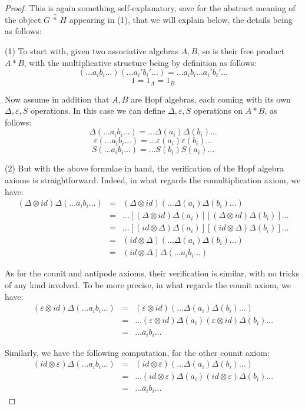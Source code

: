 \documentclass[12pt]{amsbook}
\begin{document}
\begin{proof}
This is again something self-explanatory, save for the abstract meaning of the object $G\,\hat{*}\,H$ appearing in (1), that we will explain below, the details being as follows:

\medskip

(1) To start with, given two associative algebras $A,B$, so is their free product $A*B$, with the multiplicative structure being by definition as follows:
$$(\ldots a_ib_i\ldots)(\ldots a_i'b_i'\ldots)=\ldots a_ib_i\ldots a_i'b_i'\ldots$$
$$1=1_A=1_B$$

Now assume in addition that $A,B$ are Hopf algebras, each coming with its own $\Delta,\varepsilon,S$ operations. In this case we can define $\Delta,\varepsilon,S$ operations on $A*B$, as follows:
$$\Delta(\ldots a_ib_i\ldots)=\ldots\Delta(a_i)\Delta(b_i)\ldots$$
$$\varepsilon(\ldots a_ib_i\ldots)=\ldots\varepsilon(a_i)\varepsilon(b_i)\ldots$$
$$S(\ldots a_ib_i\ldots)=\ldots S(b_i)S(a_i)\ldots$$

(2) But with the above formulae in hand, the verification of the Hopf algebra axioms is straightforward. Indeed, in what regards the comultiplication axiom, we have:
\begin{eqnarray*}
(\Delta\otimes id)\Delta(\ldots a_ib_i\ldots)
&=&(\Delta\otimes id)(\ldots\Delta(a_i)\Delta(b_i)\ldots)\\
&=&\ldots[(\Delta\otimes id)\Delta(a_i)][(\Delta\otimes id)\Delta(b_i)]\ldots\\
&=&\ldots[(id\otimes\Delta)\Delta(a_i)][(id\otimes\Delta)\Delta(b_i)]\ldots\\
&=&(id\otimes\Delta)(\ldots\Delta(a_i)\Delta(b_i)\ldots)\\
&=&(id\otimes\Delta)\Delta(\ldots a_ib_i\ldots)
\end{eqnarray*}

As for the counit and antipode axioms, their verification is similar, with no tricks of any kind involved. To be more precise, in what regards the counit axiom, we have:
\begin{eqnarray*}
(\varepsilon\otimes id)\Delta(\ldots a_ib_i\ldots)
&=&(\varepsilon\otimes id)(\ldots\Delta(a_i)\Delta(b_i)\ldots)\\
&=&\ldots(\varepsilon\otimes id)\Delta(a_i)(\varepsilon\otimes id)\Delta(b_i)\ldots\\
&=&\ldots a_ib_i\ldots
\end{eqnarray*}

Similarly, we have the following computation, for the other counit axiom:
\begin{eqnarray*}
(id\otimes\varepsilon)\Delta(\ldots a_ib_i\ldots)
&=&(id\otimes\varepsilon)(\ldots\Delta(a_i)\Delta(b_i)\ldots)\\
&=&\ldots(id\otimes\varepsilon)\Delta(a_i)(id\otimes\varepsilon)\Delta(b_i)\ldots\\
&=&\ldots a_ib_i\ldots
\end{eqnarray*}


\end{proof}
\end{document}
